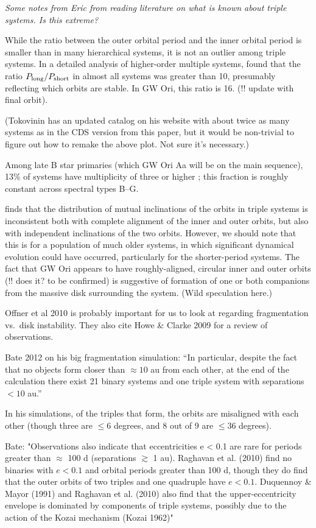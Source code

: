 \documentclass{aastex6}
\begin{document}
{\it Some notes from Eric from reading literature on what is known about triple systems.  Is this extreme?}

While the ratio between the outer orbital period and the inner orbital period is smaller than in many hierarchical systems, it is not an outlier among triple systems.  In a detailed analysis of higher-order multiple systems, \citet{tokovinin97} found that the ratio $P_{\rm long} / P_{\rm short}$ in almost all systems was greater than 10, presumably reflecting which orbits are stable.  In GW Ori, this ratio is 16.  (!! update with final orbit).

(Tokovinin has an updated catalog on his website with about twice as many systems as in the CDS version from this paper, but it would be non-trivial to figure out how to remake the above plot.  Not sure it's necessary.)

Among late B star primaries (which GW Ori Aa will be on the main sequence), 13\% of systems have multiplicity of three or higher \citep{eggleton08}; this fraction is roughly constant across spectral types B--G.

\citet{tokovinin97} finds that the distribution of mutual inclinations of the orbits in triple systems is inconsistent both with complete alignment of the inner and outer orbits, but also with independent inclinations of the two orbits.  However, we should note that this is for a population of much older systems, in which significant dynamical evolution could have occurred, particularly for the shorter-period systems.  The fact that GW Ori appears to have roughly-aligned, circular inner and outer orbits (!! does it?  to be confirmed) is suggestive of formation of one or both companions from the massive disk surrounding the system.  (Wild speculation here.)

Offner et al 2010 is probably important for us to look at regarding fragmentation vs.\ disk instability.  They also cite Howe \& Clarke 2009 for a review of observations.

Bate 2012 on his big fragmentation simulation: ``In particular, despite the fact that no objects form closer than $\approx 10$ au from each other, at the end of the calculation there exist 21 binary systems and one triple system with separations $<10$ au.''

In his simulations, of the triples that form, the orbits are misaligned with each other (though three are $\leq 6$ degrees, and 8 out of 9 are $\leq 36$ degrees).

Bate:  "Observations also indicate that eccentricities e < 0.1 are rare for periods greater than $\approx$ 100 d (separations $\gtrsim$ 1 au). Raghavan et al. (2010) find no binaries with $e < 0.1$ and orbital periods greater than 100 d, though they do find that the outer orbits of two triples and one quadruple have $e < 0.1$. Duquennoy \& Mayor (1991) and Raghavan et al. (2010) also find that the upper-eccentricity envelope is dominated by components of triple systems, possibly due to the action of the Kozai mechanism (Kozai 1962)"
\end{document}
